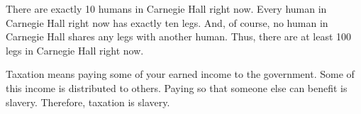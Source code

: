 \begin{exercises}
\item There are exactly 10 humans in Carnegie Hall right now. Every human in Carnegie Hall right now has exactly ten legs. And, of course, no human in Carnegie Hall shares any legs with another human. Thus, there are at least 100 legs in Carnegie Hall right now.


%

%

\item Taxation means paying some of your earned income to the government. Some of this income is distributed to others. Paying so that someone else can benefit is slavery. Therefore, taxation is slavery.



\end{exercises}

